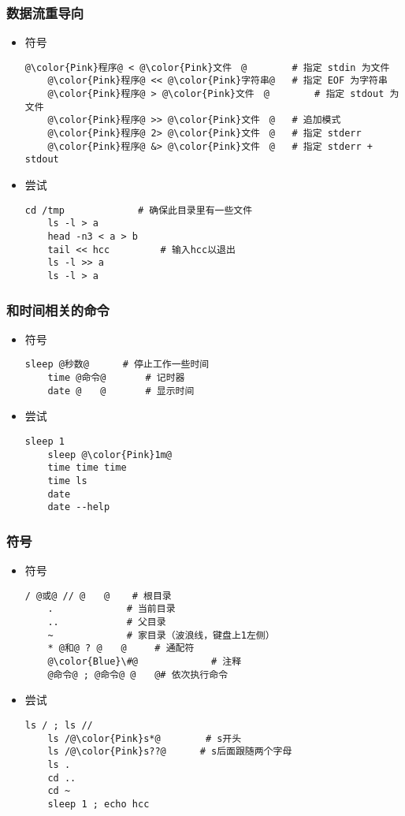 \begin{frame} [fragile]
	\frametitle{数据流重导向}
	\begin{itemize}
	\item 符号
	\begin{lstlisting}[style=bashstyle, gobble=4, texcl, escapechar=@]
	@\color{Pink}程序@ < @\color{Pink}文件　@		# 指定 stdin 为文件
	@\color{Pink}程序@ << @\color{Pink}字符串@	# 指定 EOF 为字符串
	@\color{Pink}程序@ > @\color{Pink}文件　@		# 指定 stdout 为文件
	@\color{Pink}程序@ >> @\color{Pink}文件　@	# 追加模式
	@\color{Pink}程序@ 2> @\color{Pink}文件　@	# 指定 stderr
	@\color{Pink}程序@ &> @\color{Pink}文件　@	# 指定 stderr + stdout
	\end{lstlisting}
	\item 尝试
	\begin{lstlisting}[style=bashstyle, gobble=4, texcl]
	cd /tmp				# 确保此目录里有一些文件
	ls -l > a
	head -n3 < a > b
	tail << hcc			# 输入hcc以退出
	ls -l >> a
	ls -l > a
	\end{lstlisting}
	\end{itemize}
\end{frame}

\begin{frame} [fragile]
	\frametitle{和时间相关的命令}
	\linespread{1.25}
	\begin{itemize}
	\item 符号
	\begin{lstlisting}[style=bashstyle, gobble=4, texcl, escapechar=@]
	sleep @秒数@		# 停止工作一些时间
	time @命令@		# 记时器
	date @　　@		# 显示时间
	\end{lstlisting}
	\item 尝试
	\begin{lstlisting}[style=bashstyle, gobble=4, texcl, escapechar=@]
	sleep 1
	sleep @\color{Pink}1m@
	time time time
	time ls
	date
	date --help
	\end{lstlisting}
	\end{itemize}
\end{frame}

\begin{frame} [fragile]
	\frametitle{符号}
	\linespread{0.9}
	\begin{itemize}
	\item 符号
	\begin{lstlisting}[style=bashstyle, gobble=4, texcl, escapechar=@]
	/ @或@ // @　　@	 # 根目录
	.			  # 当前目录
	..			  # 父目录
	~			  # 家目录（波浪线，键盘上1左侧）
	* @和@ ? @　　@	 # 通配符
	@\color{Blue}\#@			 # 注释
	@命令@ ; @命令@ @　　@# 依次执行命令
	\end{lstlisting}
	\item 尝试
	\begin{lstlisting}[style=bashstyle, gobble=4, texcl, escapechar=@]
	ls / ; ls //
	ls /@\color{Pink}s*@		# s开头
	ls /@\color{Pink}s??@	   # s后面跟随两个字母
	ls .
	cd ..
	cd ~
	sleep 1 ; echo hcc
	\end{lstlisting}
	\end{itemize}
\end{frame}

